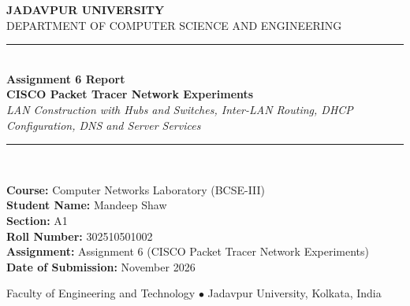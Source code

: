 \documentclass[11pt,a4paper]{article}
\begin{document}
\hypersetup{pageanchor=false}
\begin{titlepage}
  \centering
  \vspace*{1.2cm}
  {\Large \textbf{JADAVPUR UNIVERSITY}}\\[0.3cm]
  {\large DEPARTMENT OF COMPUTER SCIENCE AND ENGINEERING}\\[1.8cm]

  \rule{\linewidth}{1.2pt}\\[0.4cm]
  {\huge \textbf{Assignment 6 Report}}\\[0.3cm]
  {\LARGE \textbf{CISCO Packet Tracer Network Experiments}}\\[0.3cm]
  {\large \textit{LAN Construction with Hubs and Switches, Inter-LAN Routing, DHCP Configuration, DNS and Server Services}}\\[0.3cm]
  \rule{\linewidth}{1.2pt}\\[1.8cm]

  \begin{minipage}[t]{0.88\textwidth}
    \large
    \textbf{Course:} Computer Networks Laboratory (BCSE-III)\\[0.25cm]
    \textbf{Student Name:} Mandeep Shaw\\[0.25cm]
    \textbf{Section:} A1\\[0.25cm]
    \textbf{Roll Number:} 302510501002\\[0.25cm]
    \textbf{Assignment:} Assignment 6 (CISCO Packet Tracer Network Experiments)\\[0.25cm]
    \textbf{Date of Submission:} November 2026
  \end{minipage}

  \vfill
  {\small Faculty of Engineering and Technology $\bullet$ Jadavpur University, Kolkata, India}
  \vspace*{0.8cm}
\end{titlepage}

\hypersetup{pageanchor=true}
\tableofcontents
\newpage
{}
\setcounter{page}{1}

\end{document}
